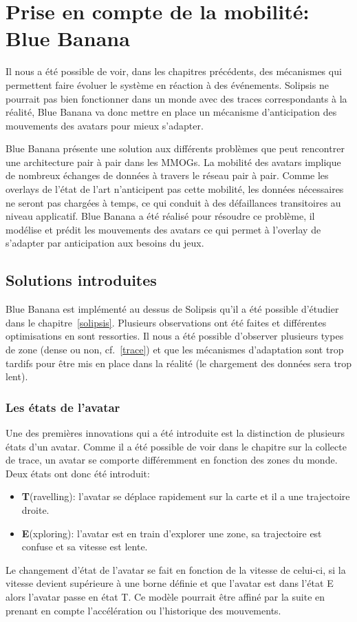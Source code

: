 \section{Prise en compte de la mobilité: Blue Banana}
	\label{BlueBanana}
	Il nous a été possible de voir, dans les chapitres précédents, des mécanismes qui permettent faire évoluer le système en réaction à des événements. Solipsis ne pourrait pas bien fonctionner dans un monde avec des traces correspondants à la réalité, Blue Banana va donc mettre en place un mécanisme d'anticipation des mouvements des avatars pour mieux s'adapter.
	\par Blue Banana présente une solution aux différents problèmes que peut rencontrer une architecture pair à pair dans les MMOGs. La mobilité des avatars implique de nombreux échanges de données à travers le réseau pair à pair. Comme les overlays de l'état de l'art n'anticipent pas cette mobilité, les données nécessaires ne seront pas chargées à temps, ce qui conduit à des défaillances transitoires au niveau applicatif. Blue Banana a été réalisé pour résoudre ce problème, il modélise et prédit les mouvements des avatars ce qui permet à l'overlay de s'adapter par anticipation aux besoins du jeux.
	\subsection{Solutions introduites}
	Blue Banana est implémenté au dessus de Solipsis qu'il a été possible d'étudier dans le chapitre~\ref{solipsis}. Plusieurs observations ont été faites et différentes optimisations en sont ressorties. Il nous a été possible d'observer plusieurs types de zone (dense ou non, cf.~\ref{trace}) et que les mécanismes d'adaptation sont trop tardifs pour être mis en place dans la réalité (le chargement des données sera trop lent).
	\subsubsection{Les états de l'avatar}
	Une des premières innovations qui a été introduite est la distinction de plusieurs états d'un avatar. Comme il a été possible de voir dans le chapitre sur la collecte de trace, un avatar se comporte différemment en fonction des zones du monde. Deux états ont donc été introduit:
	\begin{itemize}
	\renewcommand{\labelitemi}{$\bullet$}
		\item \textbf{T}(ravelling): l'avatar se déplace rapidement sur la carte et il a une trajectoire droite.  
		\item \textbf{E}(xploring): l'avatar est en train d'explorer une zone, sa trajectoire est confuse et sa vitesse est lente.
	\end{itemize} 
	Le changement d'état de l'avatar se fait en fonction de la vitesse de celui-ci, si la vitesse devient supérieure à une borne définie et que l'avatar est dans l'état E alors l'avatar passe en état T. Ce modèle pourrait être affiné par la suite en prenant en compte l'accélération ou l'historique des mouvements. \\
